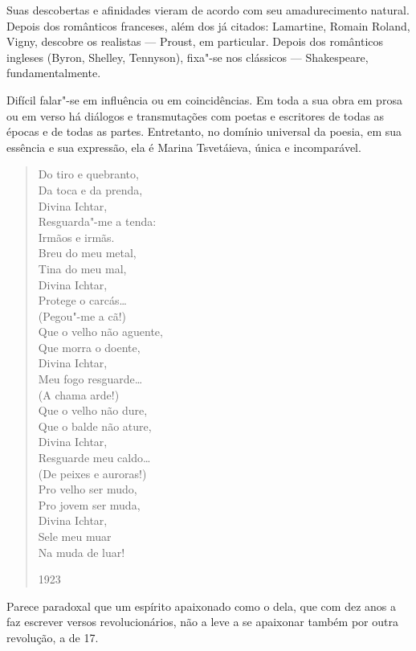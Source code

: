 Suas descobertas e afinidades vieram de acordo com seu amadurecimento
natural. Depois dos românticos franceses, além dos já citados:
Lamartine, Romain Roland, Vigny, descobre os realistas --- Proust, em
particular. Depois dos românticos ingleses (Byron, Shelley, Tennyson),
fixa"-se nos clássicos --- Shakespeare, fundamentalmente.

Difícil falar"-se em influência ou em coincidências. Em toda a sua obra
em prosa ou em verso há diálogos e transmutações com poetas e escritores
de todas as épocas e de todas as partes. Entretanto, no domínio
universal da poesia, em sua essência e sua expressão, ela é Marina
Tsvetáieva, única e incomparável.

\begin{verse}
Do tiro e quebranto, \\
Da toca e da prenda, \\
Divina Ichtar, \\
Resguarda"-me a tenda: \\[8pt]
Irmãos e irmãs. \\
Breu do meu metal, \\
Tina do meu mal, \\
Divina Ichtar, \\
Protege o carcás\ldots{} \\[8pt]
(Pegou"-me a cã!) \\[8pt]
Que o velho não aguente, \\
Que morra o doente, \\
Divina Ichtar, \\
Meu fogo resguarde\ldots{} \\[8pt]
(A chama arde!) \\[8pt]
Que o velho não dure, \\
Que o balde não ature, \\
Divina Ichtar, \\
Resguarde meu caldo\ldots{} \\[8pt]
(De peixes e auroras!) \\[8pt]
Pro velho ser mudo, \\
Pro jovem ser muda, \\
Divina Ichtar, \\
Sele meu muar \\
Na muda de luar!

1923

\end{verse}

Parece paradoxal que um espírito apaixonado como o dela, que com dez
anos a faz escrever versos revolucionários, não a leve a se apaixonar
também por outra revolução, a de 17.

